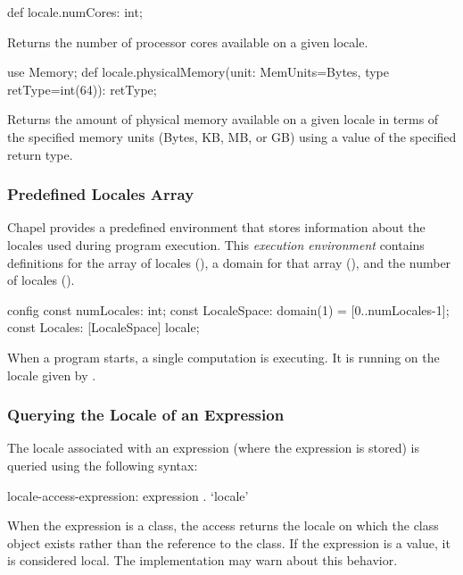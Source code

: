\begin{protohead}
def locale.numCores: int;
\end{protohead}
\begin{protobody}
Returns the number of processor cores available on a given locale.
\end{protobody}

\begin{protohead}
use Memory;
def locale.physicalMemory(unit: MemUnits=Bytes, type retType=int(64)): retType;
\end{protohead}
\begin{protobody}
Returns the amount of physical memory available on a given locale in
terms of the specified memory units (Bytes, KB, MB, or GB) using a
value of the specified return type.
\end{protobody}

\subsubsection{Predefined Locales Array}
\label{Predefined_Locales_Array}

Chapel provides a predefined environment that stores information about
the locales used during program execution.  This {\em execution
environment} contains definitions for the array of locales
(), a domain for that array (), and
the number of locales ().
\begin{chapel}
config const numLocales: int;
const LocaleSpace: domain(1) = [0..numLocales-1];
const Locales: [LocaleSpace] locale;
\end{chapel}
When a program starts, a single computation is executing.  It is
running on the locale given by .

\subsubsection{Querying the Locale of an Expression}
\label{Querying_the_Locale_of_a_Variable}

The locale associated with an expression (where the expression is
stored) is queried using the following syntax:
\begin{syntax}
locale-access-expression:
  expression . `locale'
\end{syntax}
When the expression is a class, the access returns the locale on which
the class object exists rather than the reference to the class.  If
the expression is a value, it is considered local.  The implementation
may warn about this behavior.

